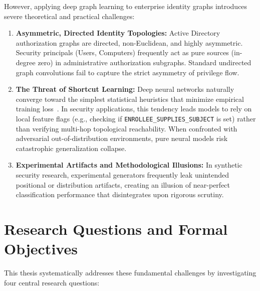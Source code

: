 However, applying deep graph learning to enterprise identity graphs introduces severe theoretical and practical challenges:
\begin{enumerate}
    \item \textbf{Asymmetric, Directed Identity Topologies:} Active Directory authorization graphs are directed, non-Euclidean, and highly asymmetric. Security principals (Users, Computers) frequently act as pure sources (in-degree zero) in administrative authorization subgraphs. Standard undirected graph convolutions fail to capture the strict asymmetry of privilege flow.
    \item \textbf{The Threat of Shortcut Learning:} Deep neural networks naturally converge toward the simplest statistical heuristics that minimize empirical training loss~\cite{geirhos2020shortcut}. In security applications, this tendency leads models to rely on local feature flags (e.g., checking if \texttt{ENROLLEE\_SUPPLIES\_SUBJECT} is set) rather than verifying multi-hop topological reachability. When confronted with adversarial out-of-distribution environments, pure neural models risk catastrophic generalization collapse.
    \item \textbf{Experimental Artifacts and Methodological Illusions:} In synthetic security research, experimental generators frequently leak unintended positional or distribution artifacts, creating an illusion of near-perfect classification performance that disintegrates upon rigorous scrutiny.
\end{enumerate}

\section{Research Questions and Formal Objectives}
\label{sec:research_questions}
This thesis systematically addresses these fundamental challenges by investigating four central research questions:

